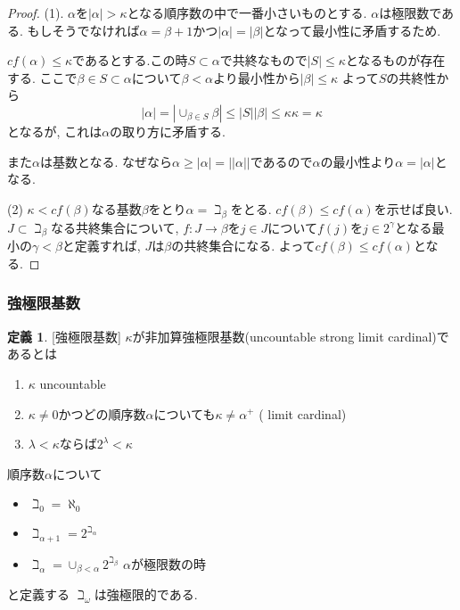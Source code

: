 \documentclass[dvipdfmx,a4paper,11pt]{report}
\theoremstyle{definition}
\newtheorem{dfn}[thm]{定義}
\begin{document}
\begin{proof}
(1). $\alpha$を$|\alpha|>\kappa$となる順序数の中で一番小さいものとする.
$\alpha$は極限数である. もしそうでなければ$\alpha = \beta +1$かつ$|\alpha|=|\beta|$となって最小性に矛盾するため.

$cf(\alpha) \le \kappa$であるとする.この時$S \subset \alpha$で共終なもので$|S| \le \kappa$となるものが存在する.
ここで$\beta \in S \subset \alpha$について$\beta < \alpha$より最小性から$|\beta| \le \kappa$
よって$S$の共終性から
$$
|\alpha|
=
|\cup_{\beta \in S}\beta|
\le 
|S| |\beta|
\le
\kappa \kappa = \kappa
$$ 
となるが, これは$\alpha$の取り方に矛盾する.

また$\alpha$は基数となる. 
なぜなら$\alpha\ge |\alpha| = || \alpha||$であるので$\alpha$の最小性より$\alpha =|\alpha| $となる. 

(2)
$\kappa < cf(\beta)$なる基数$\beta$をとり$\alpha = \beth_{\beta}$をとる.
$cf(\beta) \le cf(\alpha )$を示せば良い.
$J \subset \beth_{\beta}$なる共終集合について, $f: J \to \beta$を$j \in J$について$f(j)$を$j \in 2^{\gamma}$となる最小の$\gamma < \beta$と定義すれば, $J$は$\beta$の共終集合になる. 
よって$cf(\beta) \le cf(\alpha )$となる. 

\end{proof}



\subsubsection{強極限基数}

 \begin{tcolorbox}
 [colback = white, colframe = green!35!black, fonttitle = \bfseries,breakable = true]
\begin{dfn}\cite[定義4.5.7]{Tana}[強極限基数]
$\kappa$が非加算強極限基数(uncountable strong limit cardinal)であるとは
\begin{enumerate}
\item $\kappa$ uncountable
\item $\kappa \neq 0$かつどの順序数$\alpha$についても$\kappa \neq \alpha^{+}$ ( limit cardinal)
\item  $\lambda < \kappa$ならば$2^{\lambda} < \kappa$
\end{enumerate}
 \end{dfn}
 \end{tcolorbox}
 
 順序数$\alpha$について

\begin{itemize}
\item $\beth_0 = \aleph_0$
\item $\beth_{\alpha+1}= 2^{\beth_{\alpha}}$
\item $\beth_{\alpha}= \cup_{\beta < \alpha }2^{\beth_{\beta}}$ $\alpha$が極限数の時
\end{itemize}
と定義する
$\beth_{\omega}$は強極限的である. 
\end{document}
